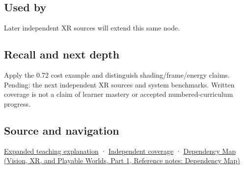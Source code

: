 \subsection{Used by}\label{appendix-5878b813b732-used-by}

\hypertarget{appendix-5878b813b732-used-by}{}

Later independent XR sources will extend this same node.

\subsection{Recall and next depth}\label{appendix-5878b813b732-recall-and-next-depth}

\hypertarget{appendix-5878b813b732-recall-and-next-depth}{}

Apply the 0.72 cost example and distinguish shading/frame/energy claims. Pending: the next independent XR sources and system benchmarks. Written coverage is not a claim of learner mastery or accepted numbered-curriculum progress.

\subsection{Source and navigation}\label{appendix-5878b813b732-source-and-navigation}

\hypertarget{appendix-5878b813b732-source-and-navigation}{}

\hyperref[04-visual-computing-ii-ch042-foveation-is-allocation-under-uncertain-perception-and-timing]{Expanded teaching explanation} · \hyperref[appendix-fd090d982a15-xr01---independent-seeing-and-representation-source]{Independent coverage} · \href{../07-Vision-XR-and-Playable-Worlds-P01/main.pdf\#appendix-4ad47bdd269a}{Dependency Map (Vision, XR, and Playable Worlds, Part 1, Reference notes: Dependency Map)}
